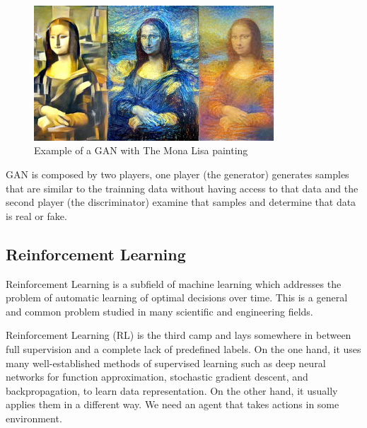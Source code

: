 \begin{figure}[H]
\centering
\includegraphics[width=0.8\textwidth]{./figures/monalisa}
\caption{Example of a GAN with The Mona Lisa painting \cite{can-art}}
\end{figure}

GAN is composed by two players, one player (the generator) generates samples that are similar to the trainning data without having access to that data and the second player (the discriminator) examine that samples and determine that data is real or fake.\cite{can-art}


\subsection[Reinforcement Learning]{Reinforcement Learning}

Reinforcement Learning is a subfield of machine learning which addresses
the problem of automatic learning of optimal decisions over time. This is
a general and common problem studied in many scientific and engineering fields.\cite{reinforcement-learning}

Reinforcement Learning (RL) is the third camp and lays somewhere in between full supervision and a complete lack of predefined labels. On the one hand, it uses many well-established methods of supervised learning such as deep neural networks for function approximation, stochastic gradient descent, and backpropagation, to learn data representation.
On the other hand, it usually applies them in a different way. We need an agent that takes actions in some environment.

